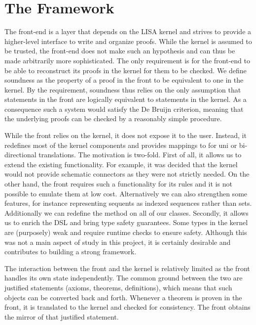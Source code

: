 \section{The Framework}
\label{sec:framework}

The front-end is a layer that depends on the LISA kernel and strives to provide a higher-level interface to write and organize proofs. While the kernel is assumed to be trusted, the front-end does not make such an hypothesis and can thus be made arbitrarily more sophisticated. The only requirement is for the front-end to be able to reconstruct its proofs in the kernel for them to be checked. We define soundness as the property of a proof in the front to be equivalent to one in the kernel. By the requirement, soundness thus relies on the only assumption that statements in the front are logically equivalent to statements in the kernel. As a consequence such a system would satisfy the De Bruijn criterion, meaning that the underlying proofs can be checked by a reasonably simple procedure.

While the front relies on the kernel, it does not expose it to the user. Instead, it redefines most of the kernel components and provides mappings to for uni or bi-directional translations. The motivation is two-fold. First of all, it allows us to extend the existing functionality. For example, it was decided that the kernel would not provide schematic connectors as they were not strictly needed. On the other hand, the front requires such a functionality for its rules and it is not possible to emulate them at low cost. Alternatively we can also strengthen some features, for instance representing sequents as indexed sequences rather than sets. Additionally we can redefine the method  on all of our classes. Secondly, it allows us to enrich the DSL and bring type safety guarantees. Some types in the kernel are (purposely) weak and require runtime checks to ensure safety. Although this was not a main aspect of study in this project, it is certainly desirable and contributes to building a strong framework.

The interaction between the front and the kernel is relatively limited as the front handles its own state independently. The common ground between the two are justified statements (axioms, theorems, definitions), which means that such objects can be converted back and forth. Whenever a theorem is proven in the front, it is translated to the kernel and checked for consistency. The front obtains the mirror of that justified statement.

